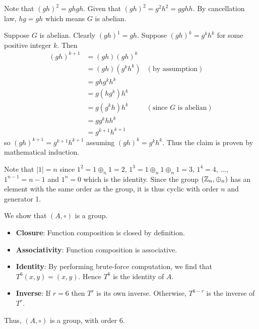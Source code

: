 \begin{questions}
    \item \begin{partquestions}{\alph*}
        \item Note that $(gh)^2 = ghgh$. Given that $(gh)^2 = g^2h^2 = gghh$. By cancellation law, $hg = gh$ which means $G$ is abelian.
        \item Suppose $G$ is abelian. Clearly $(gh)^1 = gh$. Suppose $(gh)^{k} = g^kh^k$ for some positive integer $k$. Then
        \begin{align*}
            (gh)^{k+1} &= (gh)(gh)^k\\
            &= (gh)(g^kh^k) & (\text{by assumption})\\
            &= ghg^kh^k\\
            &= g(hg^k)h^k\\
            &= g(g^kh)h^k & (\text{since } G \text{ is abelian})\\
            &= gg^khh^k\\
            &= g^{k+1}h^{k+1}
        \end{align*}
        so $(gh)^{k+1} = g^{k+1}h^{k+1}$ assuming $(gh)^k = g^kh^k$. Thus the claim is proven by mathematical induction.
    \end{partquestions}

    \item Note that $|1| = n$ since $1^2 = 1 \oplus_n 1 = 2$, $1^3 = 1 \oplus_n 1 \oplus_n 1 = 3$, $1^4 = 4$, ..., $1^{n-1} = n-1$ and $1^n = 0$ which is the identity. Since the group $(\mathbb{Z}_n, \oplus_n)$ has an element with the same order as the group, it is thus cyclic with order $n$ and generator 1.

    \item We show that $(A, \circ)$ is a group.
    \begin{itemize}
            \item \textbf{Closure}: Function composition is closed by definition.
            \item \textbf{Associativity}: Function composition is associative.
            \item \textbf{Identity}: By performing brute-force computation, we find that $T^6(x, y) = (x, y)$. Hence $T^6$ is the identity of $A$.
            \item \textbf{Inverse}: If $r = 6$ then $T^r$ is its own inverse. Otherwise, $T^{6-r}$ is the inverse of $T^r$.
    \end{itemize}
    Thus, $(A, \circ)$ is a group, with order 6.
\end{questions}
